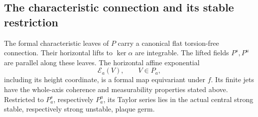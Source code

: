 \subsection{The characteristic connection and its stable restriction}

\begin{lemma}\label{real:formal-affine}
The formal characteristic leaves of $P$ carry a canonical flat
torsion-free connection. Their horizontal lifts to $\ker\alpha$
are integrable. The lifted fields $P^s,P^u$ are parallel along these
leaves. The horizontal affine exponential
\[
 \mathcal E_a(V),\qquad V\in P_a,
\]
including its height coordinate, is a formal map equivariant under
$f$. Its finite jets have the whole-axis coherence and measurability
properties stated above. Restricted to $P^s_a$, respectively
$P^u_a$, its Taylor series lies in the actual central strong stable,
respectively strong unstable, plaque germ.
\end{lemma}

